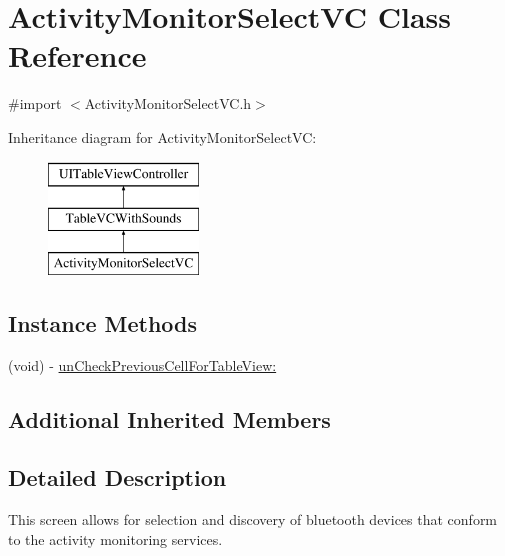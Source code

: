 \hypertarget{interface_activity_monitor_select_v_c}{\section{Activity\-Monitor\-Select\-V\-C Class Reference}
\label{interface_activity_monitor_select_v_c}
}


{\ttfamily \#import $<$Activity\-Monitor\-Select\-V\-C.\-h$>$}

Inheritance diagram for Activity\-Monitor\-Select\-V\-C\-:\begin{figure}[H]
\begin{center}
\leavevmode
\includegraphics[height=3.000000cm]{interface_activity_monitor_select_v_c}
\end{center}
\end{figure}
\subsection*{Instance Methods}
\begin{DoxyCompactItemize}
\item 
(void) -\/ \hyperlink{interface_activity_monitor_select_v_c_a108682e9afb93d81ae735b3f7ed9078e}{un\-Check\-Previous\-Cell\-For\-Table\-View\-:}
\end{DoxyCompactItemize}
\subsection*{Additional Inherited Members}


\subsection{Detailed Description}
This screen allows for selection and discovery of bluetooth devices that conform to the activity monitoring services. 

